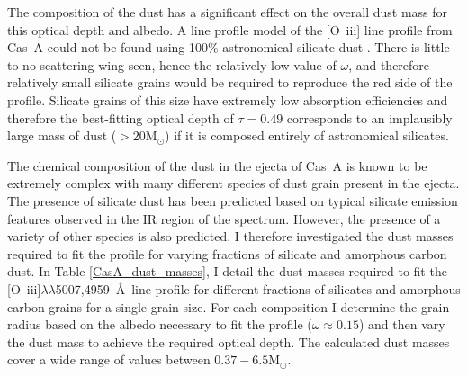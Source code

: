 The composition of the dust has a significant effect on the overall dust mass for this optical depth and albedo.  A line profile model of the [O~{\sc iii}] line profile from Cas~A could not be found using 100\% astronomical silicate dust \citep{Draine1984}.  There is little to no scattering wing seen, hence the relatively low value of $\omega$, and therefore relatively small silicate grains would be required to reproduce the red side of the profile.  Silicate grains of this size have extremely low absorption efficiencies and therefore the best-fitting optical depth of $\tau=0.49$ corresponds to an implausibly large mass of dust ($>20$M$_{\odot}$) if it is composed entirely of astronomical silicates.



The chemical composition of the dust in the ejecta of Cas~A is known to be extremely complex \citep{Arendt2014} with many different species of dust grain present in the ejecta.  The presence of silicate dust has been predicted based on typical silicate emission features observed in the IR region of the spectrum.  However, the presence of a variety of other species is also predicted.  I therefore investigated the dust masses required to fit the profile for varying fractions of silicate and amorphous carbon dust.  In Table \ref{CasA_dust_masses}, I detail the dust masses required to fit the [O~{\sc iii}]$\lambda\lambda$5007,4959~\AA\  line profile for different fractions of silicates and amorphous carbon grains for a single grain size.  For each composition I determine the grain radius based on the albedo necessary to fit the profile ($\omega\approx0.15$) and then vary the dust mass to achieve the required optical depth.  The calculated dust masses cover a wide range of values between $0.37 - 6.5$M$_{\odot}$.   

